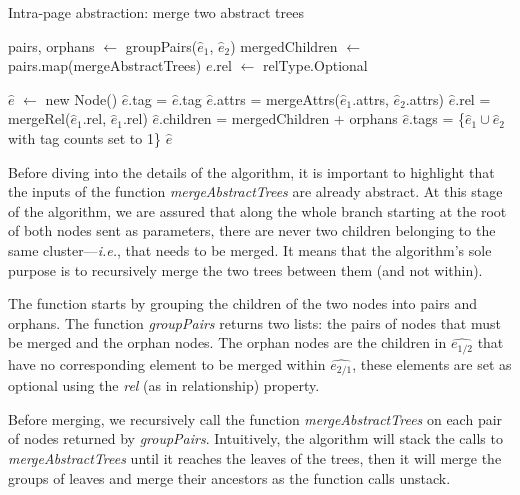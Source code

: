 \begin{algorithm}
\caption{Intra-page abstraction: merge two abstract trees}\label{appstract:alg:mergeAbstractTrees}
\begin{algorithmic}[1]
    \State {}
    \State pairs, orphans $\gets$ groupPairs($\hat{e}_1$, $\hat{e}_2$)
    \State mergedChildren $\gets$ pairs.map(mergeAbstractTrees)
        \State $e$.rel $\gets$ relType.Optional
    \EndFor
    
    \State $\hat{e}$ $\gets$ new Node()
    \State $\hat{e}$.tag = $\hat{e}$.tag
    \State $\hat{e}$.attrs = mergeAttrs($\hat{e}_1$.attrs, $\hat{e}_2$.attrs)
    \State $\hat{e}$.rel = mergeRel($\hat{e}_1$.rel, $\hat{e}_1$.rel)
    \State $\hat{e}$.children = mergedChildren + orphans
    \State $\hat{e}$.tags = \{$\hat{e}_1 \cup \hat{e}_2$ with tag counts set to 1\}
    \State \Return $\hat{e}$
  \EndFunction
\end{algorithmic}
\end{algorithm}

Before diving into the details of the algorithm, it is important to highlight that the inputs of the function \emph{mergeAbstractTrees} are already abstract.
At this stage of the algorithm, we are assured that along the whole branch starting at the root of both nodes sent as parameters, there are never two children belonging to the same cluster---\emph{i.e.}, that needs to be merged.
It means that the algorithm's sole purpose is to recursively merge the two trees between them (and not within).

The function starts by grouping the children of the two nodes into pairs and orphans.
The function \emph{groupPairs} returns two lists: the pairs of nodes that must be merged and the orphan nodes. 
The orphan nodes are the children in $\hat{e_{1/2}}$ that have no corresponding element to be merged within $\hat{e_{2/1}}$, these elements are set as optional using the \emph{rel} (as in relationship) property.

Before merging, we recursively call the function \emph{mergeAbstractTrees} on each pair of nodes returned by \emph{groupPairs}.
Intuitively, the algorithm will stack the calls to \emph{mergeAbstractTrees} until it reaches the leaves of
the trees, then it will merge the groups of leaves and merge their ancestors as the function calls unstack.

